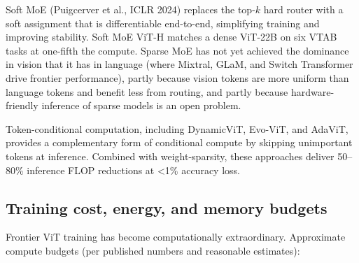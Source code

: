 \documentclass{article}
\begin{document}
Soft MoE (Puigcerver et al., ICLR 2024) replaces the top-\(k\) hard router with a soft assignment that is differentiable end-to-end, simplifying training and improving stability. Soft MoE ViT-H matches a dense ViT-22B on six VTAB tasks at one-fifth the compute. Sparse MoE has not yet achieved the dominance in vision that it has in language (where Mixtral, GLaM, and Switch Transformer drive frontier performance), partly because vision tokens are more uniform than language tokens and benefit less from routing, and partly because hardware-friendly inference of sparse models is an open problem.

Token-conditional computation, including DynamicViT, Evo-ViT, and AdaViT, provides a complementary form of conditional compute by skipping unimportant tokens at inference. Combined with weight-sparsity, these approaches deliver 50--80\% inference FLOP reductions at \textless1\% accuracy loss.

\subsection{Training cost, energy, and memory budgets}\label{training-cost-energy-and-memory-budgets}

Frontier ViT training has become computationally extraordinary. Approximate compute budgets (per published numbers and reasonable estimates):
\end{document}
